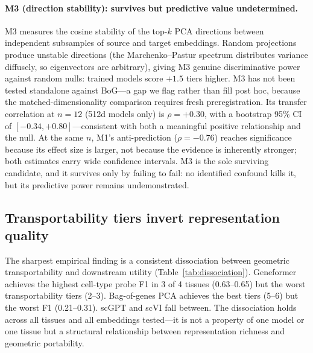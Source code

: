 \documentclass[9pt,lineno]{elife}
\begin{document}
\paragraph{M3 (direction stability): survives but predictive value undetermined.}

M3 measures the cosine stability of the top-$k$ PCA directions between independent subsamples of source and target embeddings. Random projections produce unstable directions (the Marchenko--Pastur spectrum distributes variance diffusely, so eigenvectors are arbitrary), giving M3 genuine discriminative power against random nulls: trained models score $+1.5$ tiers higher. M3 has not been tested standalone against BoG---a gap we flag rather than fill post hoc, because the matched-dimensionality comparison requires fresh preregistration. Its transfer correlation at $n = 12$ (512d models only) is $\rho = +0.30$, with a bootstrap 95\% CI of $[-0.34, +0.80]$---consistent with both a meaningful positive relationship and the null. At the same $n$, M1's anti-prediction ($\rho = -0.76$) reaches significance because its effect size is larger, not because the evidence is inherently stronger; both estimates carry wide confidence intervals. M3 is the sole surviving candidate, and it survives only by failing to fail: no identified confound kills it, but its predictive power remains undemonstrated.

\subsection{Transportability tiers invert representation quality}

The sharpest empirical finding is a consistent dissociation between geometric transportability and downstream utility (Table~\ref{tab:dissociation}). Geneformer achieves the highest cell-type probe F1 in 3 of 4 tissues (0.63--0.65) but the worst transportability tiers (2--3). Bag-of-genes PCA achieves the best tiers (5--6) but the worst F1 (0.21--0.31). scGPT and scVI fall between. The dissociation holds across all tissues and all embeddings tested---it is not a property of one model or one tissue but a structural relationship between representation richness and geometric portability.
\end{document}
